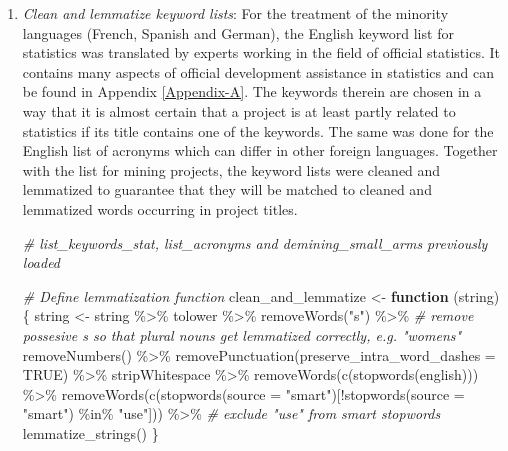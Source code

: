 \documentclass[
]{article}
\newenvironment{Shaded}{\begin{snugshade}}{\end{snugshade}}
\newcommand{\AttributeTok}[1]{\textcolor[rgb]{0.77,0.63,0.00}{#1}}
\newcommand{\CommentTok}[1]{\textcolor[rgb]{0.56,0.35,0.01}{\textit{#1}}}
\newcommand{\ConstantTok}[1]{\textcolor[rgb]{0.00,0.00,0.00}{#1}}
\newcommand{\ControlFlowTok}[1]{\textcolor[rgb]{0.13,0.29,0.53}{\textbf{#1}}}
\newcommand{\FunctionTok}[1]{\textcolor[rgb]{0.00,0.00,0.00}{#1}}
\newcommand{\NormalTok}[1]{#1}
\newcommand{\OtherTok}[1]{\textcolor[rgb]{0.56,0.35,0.01}{#1}}
\newcommand{\SpecialCharTok}[1]{\textcolor[rgb]{0.00,0.00,0.00}{#1}}
\newcommand{\StringTok}[1]{\textcolor[rgb]{0.31,0.60,0.02}{#1}}
\begin{document}
\begin{enumerate}
  \begin{enumerate}
  \def\labelenumii{\roman{enumii}.}
  \item
    \emph{Clean and lemmatize keyword lists}: For the treatment of the minority languages (French, Spanish and German), the English keyword list for statistics was translated by experts working in the field of official statistics. It contains many aspects of official development assistance in statistics and can be found in Appendix \ref{Appendix-A}. The keywords therein are chosen in a way that it is almost certain that a project is at least partly related to statistics if its title contains one of the keywords. The same was done for the English list of acronyms which can differ in other foreign languages. Together with the list for mining projects, the keyword lists were cleaned and lemmatized to guarantee that they will be matched to cleaned and lemmatized words occurring in project titles.

\begin{Shaded}
\begin{Highlighting}[]
\CommentTok{\# list\_keywords\_stat, list\_acronyms and demining\_small\_arms previously loaded}

\CommentTok{\# Define lemmatization function}
\NormalTok{clean\_and\_lemmatize }\OtherTok{\textless{}{-}} \ControlFlowTok{function}\NormalTok{ (string)\{}
\NormalTok{  string }\OtherTok{\textless{}{-}}\NormalTok{ string }\SpecialCharTok{\%\textgreater{}\%} 
\NormalTok{    tolower }\SpecialCharTok{\%\textgreater{}\%} 
    \FunctionTok{removeWords}\NormalTok{(}\StringTok{"\textquotesingle{}s"}\NormalTok{) }\SpecialCharTok{\%\textgreater{}\%} \CommentTok{\# remove possesive s so that plural nouns get lemmatized correctly, e.g. "women\textquotesingle{}s"}
    \FunctionTok{removeNumbers}\NormalTok{() }\SpecialCharTok{\%\textgreater{}\%}
    \FunctionTok{removePunctuation}\NormalTok{(}\AttributeTok{preserve\_intra\_word\_dashes =} \ConstantTok{TRUE}\NormalTok{) }\SpecialCharTok{\%\textgreater{}\%}
\NormalTok{    stripWhitespace }\SpecialCharTok{\%\textgreater{}\%} 
    \FunctionTok{removeWords}\NormalTok{(}\FunctionTok{c}\NormalTok{(}\FunctionTok{stopwords}\NormalTok{(}\StringTok{\textquotesingle{}english\textquotesingle{}}\NormalTok{))) }\SpecialCharTok{\%\textgreater{}\%} 
    \FunctionTok{removeWords}\NormalTok{(}\FunctionTok{c}\NormalTok{(}\FunctionTok{stopwords}\NormalTok{(}\AttributeTok{source =} \StringTok{"smart"}\NormalTok{)[}\SpecialCharTok{!}\FunctionTok{stopwords}\NormalTok{(}\AttributeTok{source =} \StringTok{"smart"}\NormalTok{) }\SpecialCharTok{\%in\%} \StringTok{"use"}\NormalTok{])) }\SpecialCharTok{\%\textgreater{}\%} \CommentTok{\# exclude "use" from smart stopwords }
    \FunctionTok{lemmatize\_strings}\NormalTok{()}
\NormalTok{\}}


\end{Highlighting}
\end{Shaded}
\end{enumerate}
\end{enumerate}
\end{document}
